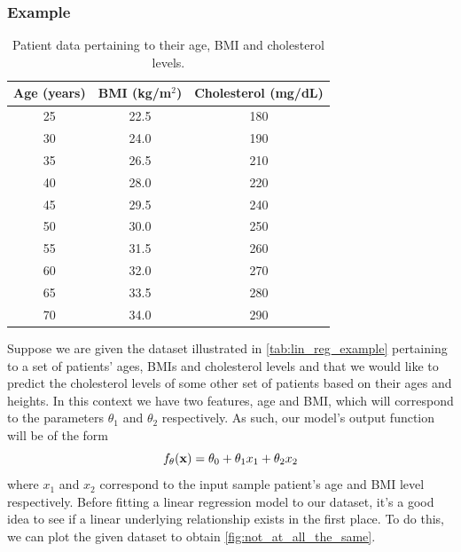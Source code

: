\documentclass[11pt]{article}
\begin{document}
\subsubsection{Example}

\begin{table}[ht]
    \begin{center}
        \begin{tabular}{c|c||c}
            Age (years) & BMI (kg/m$^2$) & Cholesterol (mg/dL)\\
            \hline
            \hline
            25 & 22.5 & 180 \\
            30 & 24.0 & 190 \\
            35 & 26.5 & 210 \\
            40 & 28.0 & 220 \\
            45 & 29.5 & 240 \\
            50 & 30.0 & 250 \\
            55 & 31.5 & 260 \\
            60 & 32.0 & 270 \\
            65 & 33.5 & 280 \\
            70 & 34.0 & 290 \\
            \hline
        \end{tabular}
    \end{center}
    \vspace{-15pt}
    \caption{\centering Patient data pertaining to their age, BMI and cholesterol levels.}
    \label{tab:lin_reg_example}
\end{table}

\noindent Suppose we are given the dataset illustrated in \autoref{tab:lin_reg_example} pertaining to a set of patients' ages, BMIs and cholesterol levels and that we would like to predict the cholesterol levels of some other set of patients based on their ages and heights. In this context we have two features, age and BMI, which will correspond to the parameters $\theta_1$ and $\theta_2$ respectively. As such, our model's output function will be of the form
$$
f_{\theta}(\mathbf{x})=\theta_0+\theta_1x_1+\theta_2x_2
$$
where $x_1$ and $x_2$ correspond to the input sample patient's age and BMI level respectively. Before fitting a linear regression model to our dataset, it's a good idea to see if a linear underlying relationship exists in the first place. To do this, we can plot the given dataset to obtain \autoref{fig:not_at_all_the_same}.
\end{document}
